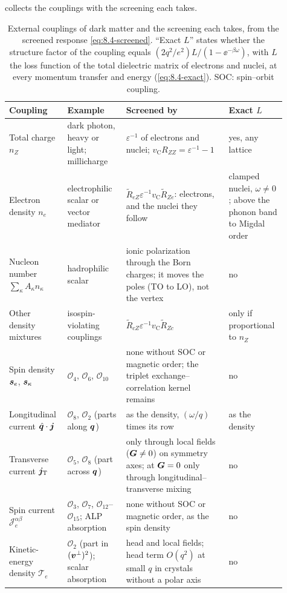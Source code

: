  collects the couplings with the screening each takes.

\begin{table}[tbp]
  \caption{External couplings of dark matter and the screening each takes, from the screened response \cref{eq:8.4-screened}. ``Exact $L$'' states whether the structure factor of the coupling equals $(2q^2/e^2)L/(1 - \ee^{-\beta\omega})$, with $L$ the loss function of the total dielectric matrix of electrons and nuclei, at every momentum transfer and energy (\cref{eq:8.4-exact}). SOC: spin--orbit coupling.}
  \label{tab:8-screening}
  \centering\small
  \renewcommand{\arraystretch}{1.25}
  \begin{tabular}{@{}>{\raggedright\arraybackslash}p{0.17\linewidth}>{\raggedright\arraybackslash}p{0.2\linewidth}>{\raggedright\arraybackslash}p{0.35\linewidth}>{\raggedright\arraybackslash}p{0.19\linewidth}@{}}
    \toprule
    Coupling & Example & Screened by & Exact $L$ \\
    \midrule
    Total charge $n_Z$ & dark photon, heavy or light; millicharge & $\varepsilon^{-1}$ of electrons and nuclei; $v_{\mathrm{C}}R_{ZZ} = \varepsilon^{-1} - 1$ & yes, any lattice \\
    Electron density $n_e$ & electrophilic scalar or vector mediator & $\tilde R_{eZ}\varepsilon^{-1}v_{\mathrm{C}}\tilde R_{Ze}$: electrons, and the nuclei they follow & clamped nuclei, $\omega \ne 0$; above the phonon band to Migdal order \\
    Nucleon number $\sum_\kappa A_\kappa n_\kappa$ & hadrophilic scalar & ionic polarization through the Born charges; it moves the poles (TO to LO), not the vertex & no \\
    Other density mixtures & isospin-violating couplings & $\tilde R_{cZ}\varepsilon^{-1}v_{\mathrm{C}}\tilde R_{Zc}$ & only if proportional to $n_Z$ \\
    Spin density $\bm{s}_e$, $\bm{s}_\kappa$ & $\mathcal{O}_4$, $\mathcal{O}_6$, $\mathcal{O}_{10}$ & none without SOC or magnetic order; the triplet exchange--correlation kernel remains & no \\
    Longitudinal current $\hat{\bm{q}}\cdot\bm{j}$ & $\mathcal{O}_8$, $\mathcal{O}_2$ (parts along $\bm{q}$) & as the density, $(\omega/q)$ times its row & as the density \\
    Transverse current $\bm{j}_{\mathrm{T}}$ & $\mathcal{O}_5$, $\mathcal{O}_8$ (part across $\bm{q}$) & only through local fields ($\bm{G} \ne 0$) on symmetry axes; at $\bm{G} = 0$ only through longitudinal--transverse mixing & no \\
    Spin current $\mathcal{J}^{\alpha\beta}_e$ & $\mathcal{O}_3$, $\mathcal{O}_7$, $\mathcal{O}_{12}$--$\mathcal{O}_{15}$; ALP absorption & none without SOC or magnetic order, as the spin density & no \\
    Kinetic-energy density $\mathcal{T}_e$ & $\mathcal{O}_2$ (part in $(\bm{v}^\perp)^2$); scalar absorption & head and local fields; head term $O(q^2)$ at small $q$ in crystals without a polar axis & no \\
    \bottomrule
  \end{tabular}
\end{table}

